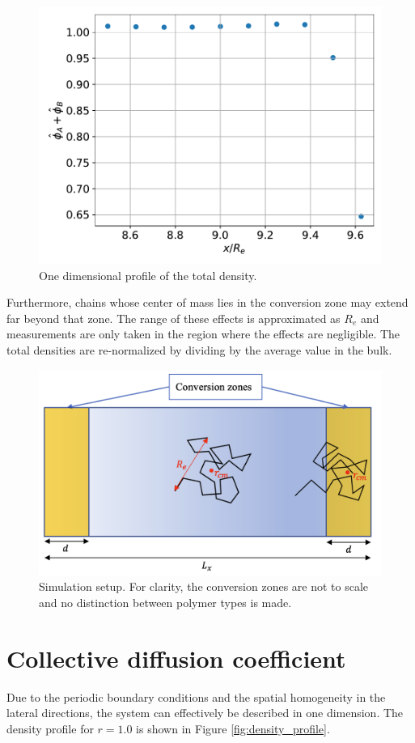 \documentclass[bachelor,       %
               twoside,        %
               BCOR10mm,       %
               ngerman, english %
               ]{GAUBM}
\begin{document}
\begin{figure}[H]
  \centering
  \includegraphics[width=0.7\linewidth]{figures/density_drop.pdf}
  \caption{One dimensional profile of the total density.}
  \label{fig:density_drop}
\end{figure}

Furthermore, chains whose center of mass lies in the conversion zone may extend far beyond that zone. The range of these effects is approximated as $R_e$ and measurements are only taken in the region where the effects are negligible. The total densities are re-normalized by dividing by the average value in the bulk.


\begin{figure}[h]
  \centering
  \includegraphics[width=0.7\linewidth]{figures/simulation_box.png}
  \caption{Simulation setup. For clarity, the conversion zones are not to scale and no distinction between polymer types is made.}
  \label{fig:simulation_box}
\end{figure}


\section{Collective diffusion coefficient}
\label{sec:colldiff}

Due to the periodic boundary conditions and the spatial homogeneity in the lateral directions, the system can effectively be described in one dimension. The density profile for $r=1.0$ is shown in Figure \ref{fig:density_profile}.
\end{document}
